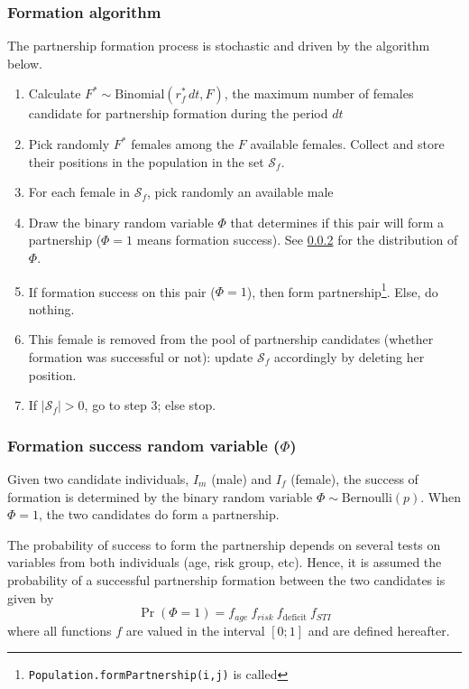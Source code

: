 \documentclass[11pt, onecolumn]{article}
\newcommand{\ttt}[1]{\texttt{#1}}
\begin{document}
\subsubsection{Formation algorithm}

The partnership formation process is stochastic and driven by the algorithm below. 

\begin{enumerate}

\item Calculate $F^* \sim\text{Binomial}(r^*_f\,dt, F)$, the maximum number of females  candidate for partnership formation during the period $dt$

\item Pick randomly $F^*$ females among the $F$ available females. Collect and store their positions in the population in the set $\mathcal{S}_f$. 

\item For each female in $\mathcal{S}_f$, pick randomly an available male 

\item Draw the binary random variable $\Phi$ that determines if this pair will form a partnership ($\Phi=1$ means formation success). See \ref{formationSuccessFormula} for the  distribution of $\Phi$.

\item If formation success on this pair ($\Phi=1$), then form partnership\footnote{\ttt{Population.formPartnership(i,j)} is called}. Else, do nothing.
\item This female is removed from the pool of partnership candidates (whether formation was successful or not): update $\mathcal{S}_f$ accordingly by deleting her position.
\item If $|\mathcal{S}_f|>0$, go to step 3; else stop.
\end{enumerate}


\subsubsection{Formation success random variable ($\Phi$)}
\label{formationSuccessFormula}
Given two candidate individuals, $I_m$ (male) and $I_f$ (female), the success of formation is determined by the binary random variable $\Phi\sim\mathrm{Bernoulli}(p)$. When $\Phi=1$, the two candidates do form a partnership.

The probability of success to form the partnership depends on several tests on variables from both individuals (age, risk group, etc). Hence, it is assumed the probability of a successful partnership formation between the two candidates is given by
\begin{equation}
\label{probaFormation}
\Pr(\Phi=1) = f_{age}\ f_{risk}\ f_{\mathrm{deficit}}\ f_{STI}
\end{equation}
where all functions $f$ are valued in the interval $[0;1]$ and are defined hereafter.
\end{document}
